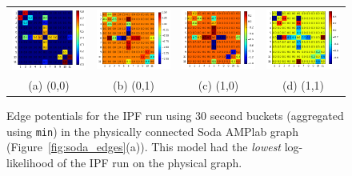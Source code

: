\begin{figure}
\centering
\begin{tabular}{cccc}
\includegraphics[width=1.3in]{figs/30secmin00conf} & \includegraphics[width=1.3in]{figs/30secmin01conf} & \includegraphics[width=1.3in]{figs/30secmin10conf} & \includegraphics[width=1.3in]{figs/30secmin11conf} \\
(a) (0,0) & (b) (0,1) & (c) (1,0) & (d) (1,1) \\[6pt]
\end{tabular}
\caption{Edge potentials for the IPF run using 30 second buckets (aggregated using \texttt{min}) in the physically connected Soda AMPlab graph (Figure~\ref{fig:soda_edges}(a)). This model had the \emph{lowest} log-likelihood of the IPF run on the physical graph.}
\label{fig:30secminphysical}
\end{figure}

